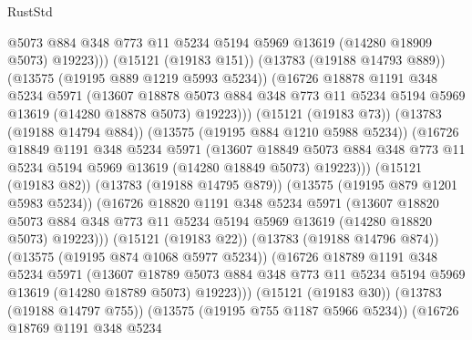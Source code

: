\begin{lexlean}{RustStd}
\begin{coremodule}
                    @5073
                    @884
                    @348
                    @773
                    @11
                    @5234
                    @5194
                    @5969
                    @13619
                    (@14280 @18909 @5073)
                    @19223)))
              (@15121 (@19183 @151))
              (@13783 (@19188 @14793 @889))
              (@13575 (@19195 @889 @1219 @5993 @5234))
              (@16726
                @18878
                @1191
                @348
                @5234
                @5971
                (@13607
                  @18878
                  @5073
                  @884
                  @348
                  @773
                  @11
                  @5234
                  @5194
                  @5969
                  @13619
                  (@14280 @18878 @5073)
                  @19223)))
            (@15121 (@19183 @73))
            (@13783 (@19188 @14794 @884))
            (@13575 (@19195 @884 @1210 @5988 @5234))
            (@16726
              @18849
              @1191
              @348
              @5234
              @5971
              (@13607
                @18849
                @5073
                @884
                @348
                @773
                @11
                @5234
                @5194
                @5969
                @13619
                (@14280 @18849 @5073)
                @19223)))
          (@15121 (@19183 @82))
          (@13783 (@19188 @14795 @879))
          (@13575 (@19195 @879 @1201 @5983 @5234))
          (@16726
            @18820
            @1191
            @348
            @5234
            @5971
            (@13607
              @18820
              @5073
              @884
              @348
              @773
              @11
              @5234
              @5194
              @5969
              @13619
              (@14280 @18820 @5073)
              @19223)))
        (@15121 (@19183 @22))
        (@13783 (@19188 @14796 @874))
        (@13575 (@19195 @874 @1068 @5977 @5234))
        (@16726
          @18789
          @1191
          @348
          @5234
          @5971
          (@13607
            @18789
            @5073
            @884
            @348
            @773
            @11
            @5234
            @5194
            @5969
            @13619
            (@14280 @18789 @5073)
            @19223)))
      (@15121 (@19183 @30))
      (@13783 (@19188 @14797 @755))
      (@13575 (@19195 @755 @1187 @5966 @5234))
      (@16726
        @18769
        @1191
        @348
        @5234

\end{coremodule}
\end{lexlean}
